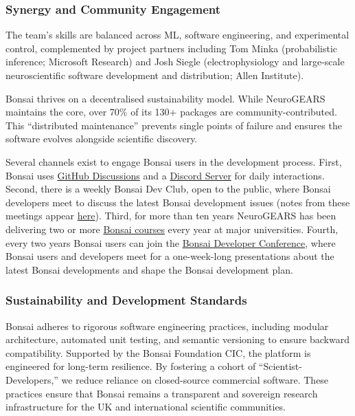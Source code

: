 \subsubsection{Synergy and Community Engagement}

The team’s skills are balanced across ML, software engineering, and
experimental control, complemented by project partners including Tom Minka
(probabilistic inference; Microsoft Research) and Josh Siegle
(electrophysiology and large-scale neuroscientific software development and
distribution; Allen Institute).

Bonsai thrives on a decentralised sustainability model. While NeuroGEARS
maintains the core, over 70\% of its 130+ packages are community-contributed.
This ``distributed maintenance'' prevents single points of failure and ensures
the software evolves alongside scientific discovery.

Several channels exist to engage Bonsai users in the development process.
%
First, Bonsai uses \href{https://github.com/orgs/bonsai-rx/discussions}{GitHub
Discussions} and a \href{https://discord.gg/FB5MSKgh}{Discord Server} for daily
interactions.
%
Second, there is a weekly Bonsai Dev Club, open to the public, where Bonsai
developers meet to discuss the latest Bonsai development issues (notes from
these meetings appear
\href{https://github.com/orgs/bonsai-rx/discussions/categories/dev-club}{here}).
%
Third, for more than ten years NeuroGEARS has been delivering two or more
\href{https://bonsai-rx.org/learn/}{Bonsai courses} every year at major
universities.
%
Fourth, every two years Bonsai users can join the
\href{https://conference.bonsai-rx.org/2024/}{Bonsai Developer Conference},
where Bonsai users and developers meet for a one-week-long presentations about
the latest Bonsai developments and shape the Bonsai development plan.

\subsubsection{Sustainability and Development Standards}

Bonsai adheres to rigorous software engineering practices, including modular
architecture, automated unit testing, and semantic versioning to ensure
backward compatibility. Supported by the Bonsai Foundation CIC, the platform is
engineered for long-term resilience. By fostering a cohort of
``Scientist-Developers,'' we reduce reliance on closed-source commercial
software. These practices ensure that Bonsai remains a transparent and
sovereign research infrastructure for the UK and international scientific
communities.
